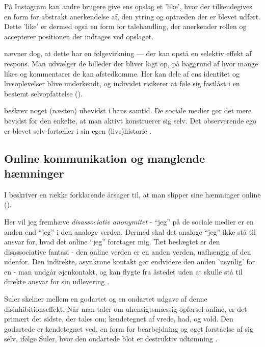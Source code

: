 På Instagram kan andre brugere give ens opslag et 'like', hvor der 
tilkendegives en form for abstrakt anerkendelse af, den ytring og 
optræden der er blevet udført. Dette 'like' er dermed også en form 
for talehandling, der anerkender rollen og accepterer positionen 
der indtages ved opslaget.

\citeauthor{sulerSelfPortraitsSelfies2015} nævner dog, at dette 
har en følgevirkning — der kan opstå en selektiv effekt af 
respons. Man udvælger de billeder der bliver lagt op, på baggrund 
af hvor mange likes og kommentarer de kan afstedkomme.  Her kan 
dele af ens identitet og livsoplevelser blive underkendt, og 
individet risikerer at føle sig fastlåst i en bestemt 
selvopfattelse (\citeyear{sulerSelfPortraitsSelfies2015}).

\citeauthor{goffmanPresentationSelfEveryday1956} beskrev noget 
(næsten) ubevidst i hans samtid. De sociale medier gør det mere 
bevidst for den enkelte, at man aktivt konstruerer sig selv.
Det observerende ego er blevet selv-fortæller i sin egen 
(livs)historie \autocite{sulerSelfPortraitsSelfies2015}.

\subsection{Online kommunikation og manglende hæmninger}

I  beskriver 
\citeauthor{sulerOnlineDisinhibitionEffect2004}  en række 
forklarende årsager til, at man slipper sine
hæmninger online (\citeyear{sulerOnlineDisinhibitionEffect2004}).

Her vil jeg fremhæve \emph{disassociativ anonymitet} - “jeg” på de
sociale medier er en anden end “jeg” i den analoge verden.  Dermed
skal det analoge “jeg” ikke stå til ansvar for, hvad det online 
“jeg” foretager mig. Tæt beslægtet er den disassociative fantasi -
den online verden er en anden verden, uafhængig af den udenfor.
Den indirekte, asynkrone kontakt gør endvidere den anden 'usynlig'
for en - man undgår øjenkontakt, og kan flygte fra åstedet uden at
skulle stå til direkte ansvar for sin udlevering \autocite[s.  
184]{sulerOnlineDisinhibitionEffect2004}.

Suler skelner mellem en godartet og en ondartet udgave af denne
disinhibitionseffekt. Når man taler om uhensigtsmæssig opførsel
online, er det primært det sidste, der tales om; kendetegnet af
vrede, had, og vold. Den godartede er kendetegnet ved, en form for
bearbejdning og øget forståelse af sig selv, ifølge Suler, hvor
den ondartede blot er destruktiv udtømning \autocite[s.  
185]{sulerOnlineDisinhibitionEffect2004}.

